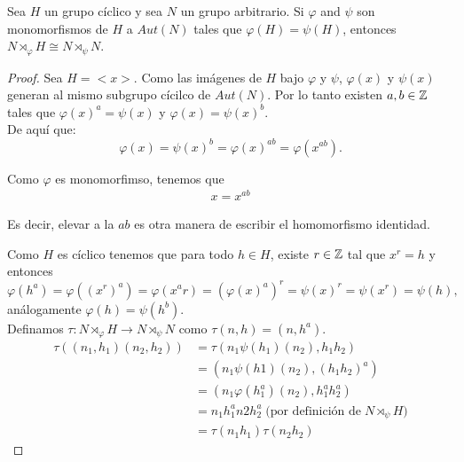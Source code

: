 \begin{lema}
    Sea $H$ un grupo cíclico y sea $N$ un grupo arbitrario. Si $\varphi$ and $\psi$ son monomorfismos 
    de $H$ a $Aut(N)$ tales que $\varphi(H) = \psi(H)$, entonces 
    $N \rtimes_\varphi H \cong N \rtimes_\psi N$. \par\null
\end{lema}

\begin{proof}
    Sea $H = <x>$. Como las imágenes de $H$ bajo $\varphi$ y $\psi$, $\varphi(x)$ y $\psi(x)$ generan
    al mismo subgrupo cícilco de $Aut(N)$. Por lo tanto existen $a,b \in \mathbb{Z}$ tales que 
    $\varphi(x)^a = \psi(x)$ y $\varphi(x) = \psi(x)^b$. \\ 
    
    De aquí que:
    \begin{equation} 
      \varphi(x) = \psi(x)^b = \varphi(x)^{ab} = \varphi(x^{ab}).
    \end{equation}

    Como $\varphi$ es monomorfimso, tenemos que 
    \begin{align} 
        x = x^{ab} \label{propocicion11:identidad}
    \end{align} 
    
    Es decir, elevar a la $ab$ es otra manera de escribir el homomorfismo identidad.		
    
    Como $H$ es cíclico tenemos que para todo $h \in H$, existe $r \in \mathbb{Z}$ tal que $x^r = h$ y entonces
    $$
    \varphi(h^a) = \varphi((x^r)^a) = 
    \varphi(x^ar) = (\varphi(x)^a)^r = 
    \psi(x)^r = \psi(x^r) = \psi(h),
    $$ 
    análogamente $\varphi(h) = \psi(h^b)$.  \\
    
    Definamos $\tau : N \rtimes_\varphi H \rightarrow N \rtimes_\psi N$ como $\tau(n,h)= (n, h^a)$.\\
    
    \begin{align}
    \tau((n_1, h_1)(n_2, h_2))	&=  \tau(n_1 \psi(h_1)(n_2), h_1h_2)\\
                                &= (n_1\psi(h1)(n_2), (h_1 h_2)^a) \\
                                &= (n_1\varphi(h_1^a)(n_2), h_1^a h_2^a)\\
                                &= n_1 h_1^a n2 h_2^a  \;\text{(por definición de} \; N \rtimes_\psi H \text{)}\\
                                &= \tau(n_1 h_1) \tau(n_2 h_2)
    \end{align}
                                    

\end{proof}
